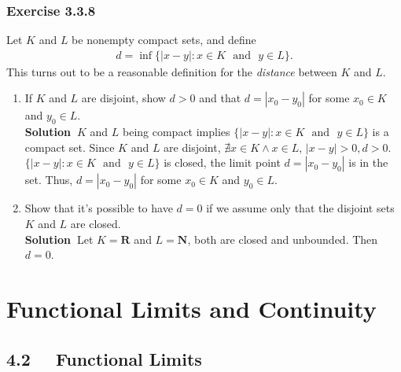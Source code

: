 \documentclass[12pt]{report}
\newcommand{\sol}{{\textbf{Solution~}}}
\begin{document}
\subsection*{Exercise 3.3.8}
Let $K$ and $L$ be nonempty compact sets, and define
\begin{align*}
    d=\inf\{|x-y|:x \in K \text{~~and~~} y \in L\}.
\end{align*}
This turns out to be a reasonable definition for the \textit{distance} between $K$ and $L$.
\begin{enumerate}[label=(\alph*)]
    \item If $K$ and $L$ are disjoint, show $d >0$ and that $d=|x_0-y_0|$ for some $x_0 \in K$ and 
    $y_0 \in L$.\\
    \sol $K$ and $L$ being compact implies $\{|x-y|:x \in K \text{~~and~~} y \in L\}$ is a compact set. 
    Since $K$ and $L$ are disjoint, $\nexists x \in K \land x \in L$, $|x-y| >0, d >0$.
    $\{|x-y|:x \in K \text{~~and~~} y \in L\}$ is closed, the limit point $d=|x_0-y_0|$ is in the set. 
    Thus, $d=|x_0-y_0|$ for some $x_0 \in K$ and $y_0 \in L$.
    \item Show that it's possible to have $d=0$ if we assume only that the disjoint sets $K$ 
    and $L$ are closed.\\
    \sol Let $K = \mathbf{R}$ and $L=\mathbf{N}$, both are closed and unbounded. Then $d=0$.
\end{enumerate}

\chapter{Functional Limits and Continuity}
\section{4.2 ~~Functional Limits}
\end{document}
